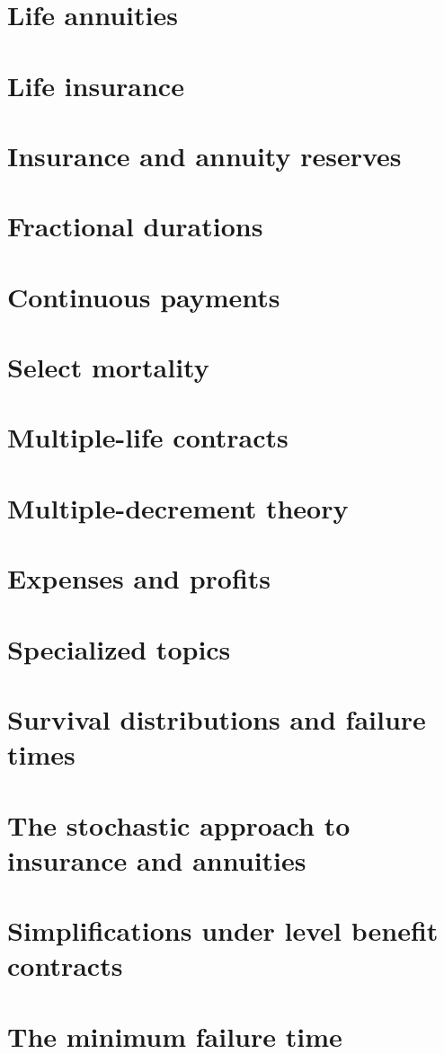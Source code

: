 \documentclass{article}
\begin{document}
\section{Life annuities}
\section{Life insurance}
\section{Insurance and annuity reserves}
\section{Fractional durations}
\section{Continuous payments}
\section{Select mortality}
\section{Multiple-life contracts}
\section{Multiple-decrement theory}
\section{Expenses and profits}
\section{Specialized topics}
\section{Survival distributions and failure times}
\section{The stochastic approach to insurance and annuities}
\section{Simplifications under level benefit contracts}
\section{The minimum failure time}
\end{document}
